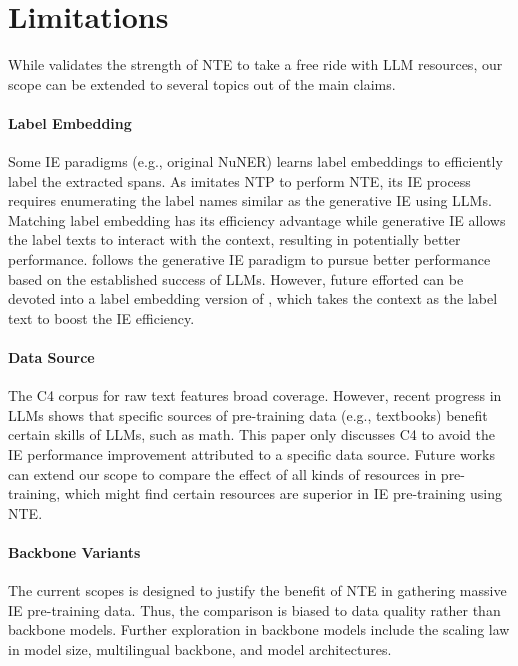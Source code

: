\section*{Limitations}

While \our validates the strength of NTE to take a free ride with LLM resources, our scope can be extended to several topics out of the main claims.

\paragraph{Label Embedding} Some IE paradigms (e.g., original NuNER) learns label embeddings to efficiently label the extracted spans. As \our imitates NTP to perform NTE, its IE process requires enumerating the label names similar as the generative IE using LLMs. Matching label embedding has its efficiency advantage while generative IE allows the label texts to interact with the context, resulting in potentially better performance. \our follows the generative IE paradigm to pursue better performance based on the established success of LLMs. However, future efforted can be devoted into a label embedding version of \our, which takes the context as the label text to boost the IE efficiency.

\paragraph{Data Source} The C4 corpus for raw text features broad coverage. However, recent progress in LLMs shows that specific sources of pre-training data (e.g., textbooks) benefit certain skills of LLMs, such as math. This paper only discusses C4 to avoid the IE performance improvement attributed to a specific data source. Future works can extend our scope to compare the effect of all kinds of resources in pre-training, which might find certain resources are superior in IE pre-training using NTE.

\paragraph{Backbone Variants} The current scopes is designed to justify the benefit of NTE in gathering massive IE pre-training data. Thus, the comparison is biased to data quality rather than backbone models. Further exploration in backbone models include the scaling law in model size, multilingual backbone, and model architectures.